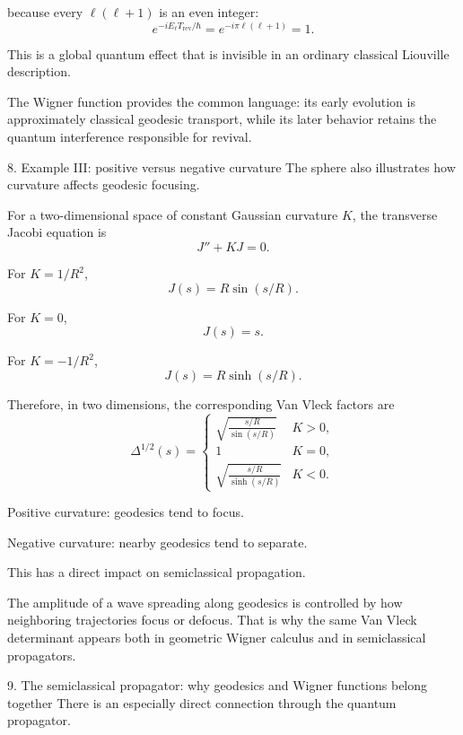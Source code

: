 because every \(\ell(\ell+1)\) is an even integer:
\[
e^{-iE_\ell T_{\mathrm{rev}}/\hbar}
=e^{-i\pi\ell(\ell+1)}=1.
\]

This is a global quantum effect that is invisible in an ordinary classical Liouville description.

The Wigner function provides the common language: its early evolution is approximately classical geodesic transport, while its later behavior retains the quantum interference responsible for revival.

8. Example III: positive versus negative curvature
The sphere also illustrates how curvature affects geodesic focusing.

For a two-dimensional space of constant Gaussian curvature \(K\), the transverse Jacobi equation is
\[
J''+KJ=0.
\tag{83}
\]

For \(K=1/R^2\),
\[
J(s)=R\sin(s/R).
\]

For \(K=0\),
\[
J(s)=s.
\]

For \(K=-1/R^2\),
\[
J(s)=R\sinh(s/R).
\]

Therefore, in two dimensions, the corresponding Van Vleck factors are
\[
\Delta^{1/2}(s)=
\begin{cases}
\displaystyle
\sqrt{\frac{s/R}{\sin(s/R)}} & K>0,\\[8pt]
1 & K=0,\\[6pt]
\displaystyle
\sqrt{\frac{s/R}{\sinh(s/R)}} & K<0.
\end{cases}
\tag{84}
\]










Positive curvature: geodesics tend to focus.










Negative curvature: nearby geodesics tend to separate.


This has a direct impact on semiclassical propagation.

The amplitude of a wave spreading along geodesics is controlled by how neighboring trajectories focus or defocus. That is why the same Van Vleck determinant appears both in geometric Wigner calculus and in semiclassical propagators.

9. The semiclassical propagator: why geodesics and Wigner functions belong together
There is an especially direct connection through the quantum propagator.

